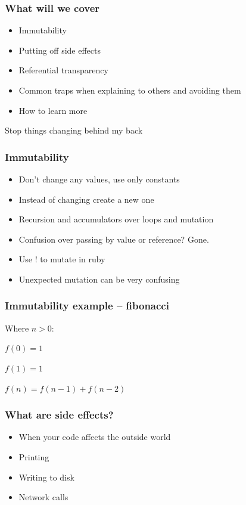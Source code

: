 \documentclass{beamer}
\begin{document}
\begin{frame}
  \frametitle{What will we cover}
  \begin{itemize}
    \item Immutability
    \item Putting off side effects
    \item Referential transparency
    \item Common traps when explaining to others and avoiding them
    \item How to learn more
  \end{itemize}
\end{frame}

\begin{frame}
  \begin{center}
    \Huge Stop things changing behind my back
  \end{center}
\end{frame}

\begin{frame}
  \frametitle{Immutability}
  \begin{itemize}
    \item Don't change any values, use only constants
    \item Instead of changing create a new one
    \item Recursion and accumulators over loops and mutation
    \item Confusion over passing by value or reference? Gone.
    \item Use ! to mutate in ruby
    \item Unexpected mutation can be very confusing
  \end{itemize}
\end{frame}

\begin{frame}
  \frametitle{Immutability example -- fibonacci}
  Where $n > 0$:

  $f(0) = 1$

  $f(1) = 1$

  $f(n) = f(n - 1) +f(n - 2)$
\end{frame}

\begin{frame}
  \frametitle{What are side effects?}
  \begin{itemize}
    \item When your code affects the outside world
    \item Printing
    \item Writing to disk
    \item Network calls
  \end{itemize}
\end{frame}
\end{document}
